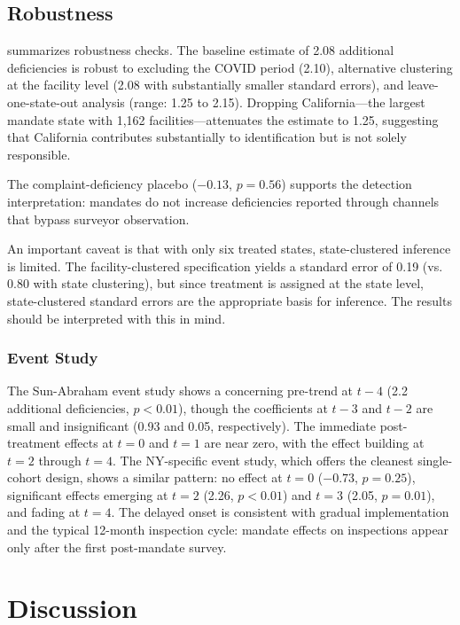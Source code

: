 \documentclass[12pt]{article}
\begin{document}
\subsection{Robustness}



 summarizes robustness checks. The baseline estimate of 2.08 additional deficiencies is robust to excluding the COVID period (2.10), alternative clustering at the facility level (2.08 with substantially smaller standard errors), and leave-one-state-out analysis (range: 1.25 to 2.15). Dropping California---the largest mandate state with 1,162 facilities---attenuates the estimate to 1.25, suggesting that California contributes substantially to identification but is not solely responsible.

The complaint-deficiency placebo ($-0.13$, $p = 0.56$) supports the detection interpretation: mandates do not increase deficiencies reported through channels that bypass surveyor observation.

An important caveat is that with only six treated states, state-clustered inference is limited. The facility-clustered specification yields a standard error of 0.19 (vs. 0.80 with state clustering), but since treatment is assigned at the state level, state-clustered standard errors are the appropriate basis for inference. The results should be interpreted with this in mind.

\subsubsection*{Event Study} The Sun-Abraham event study shows a concerning pre-trend at $t-4$ (2.2 additional deficiencies, $p < 0.01$), though the coefficients at $t-3$ and $t-2$ are small and insignificant (0.93 and 0.05, respectively). The immediate post-treatment effects at $t=0$ and $t=1$ are near zero, with the effect building at $t=2$ through $t=4$. The NY-specific event study, which offers the cleanest single-cohort design, shows a similar pattern: no effect at $t=0$ ($-0.73$, $p = 0.25$), significant effects emerging at $t=2$ (2.26, $p < 0.01$) and $t=3$ (2.05, $p = 0.01$), and fading at $t=4$. The delayed onset is consistent with gradual implementation and the typical 12-month inspection cycle: mandate effects on inspections appear only after the first post-mandate survey.

\section{Discussion}
\end{document}
